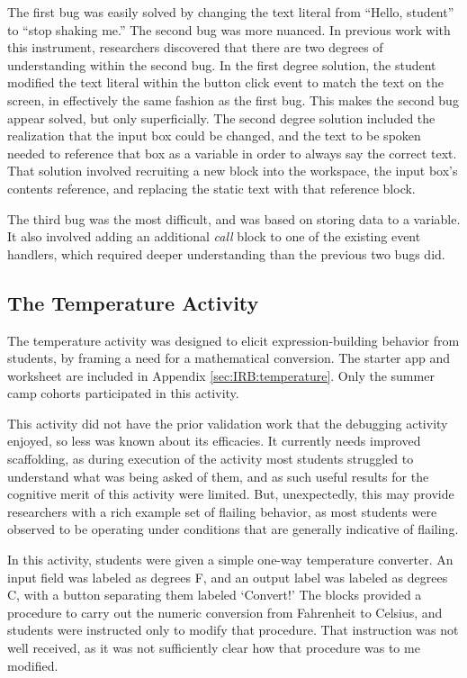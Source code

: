 The first bug was easily solved by changing the text literal from ``Hello, student'' to ``stop shaking me.'' The second bug was more nuanced. In previous work with this instrument, researchers discovered that there are two degrees of understanding within the second bug. In the first degree solution, the student modified the text literal within the button click event to match the text on the screen, in effectively the same fashion as the first bug. This makes the second bug appear solved, but only superficially. The second degree solution included the realization that the input box could be changed, and the text to be spoken needed to reference that box as a variable in order to always say the correct text. That solution involved recruiting a new block into the workspace, the input box's contents reference, and replacing the static text with that reference block.

The third bug was the most difficult, and was based on storing data to a variable. It also involved adding an additional \emph{call} block to one of the existing event handlers, which required deeper understanding than the previous two bugs did. %

\subsection{The Temperature Activity}

The temperature activity was designed to elicit expression-building behavior from students, by framing a need for a mathematical conversion. The starter app and worksheet are included in Appendix \ref{sec:IRB:temperature}. Only the summer camp cohorts participated in this activity.

This activity did not have the prior validation work that the debugging activity enjoyed, so less was known about its efficacies. It currently needs improved scaffolding, as during execution of the activity most students struggled to understand what was being asked of them, and as such useful results for the cognitive merit of this activity were limited. But, unexpectedly, this may provide researchers with a rich example set of flailing behavior, as most students were observed to be operating under conditions that are generally indicative of flailing. 

In this activity, students were given a simple one-way temperature converter. An input field was labeled as degrees F, and an output label was labeled as degrees C, with a button separating them labeled `Convert!' The blocks provided a procedure to carry out the numeric conversion from Fahrenheit to Celsius, and students were instructed only to modify that procedure. That instruction was not well received, as it was not sufficiently clear how that procedure was to me modified. 

